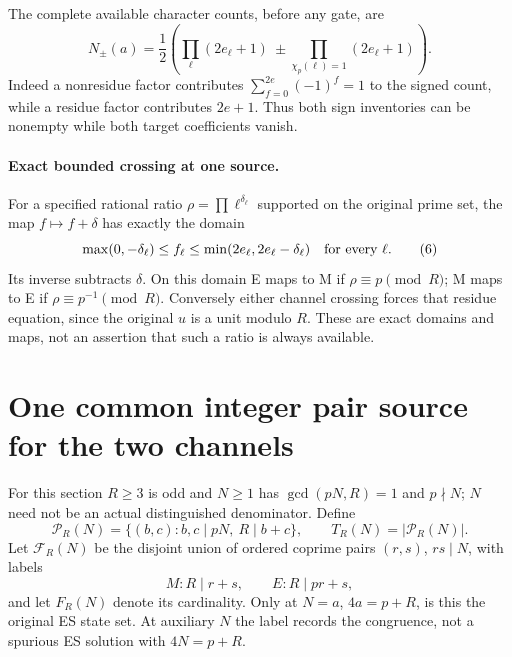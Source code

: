 The complete available character counts, before any gate, are
\[
 N_\pm(a)=\frac12\left(\prod_\ell(2e_\ell+1)
 \ \pm\!\prod_{\chi_p(\ell)=1}(2e_\ell+1)\right).          \tag{5}
\]
Indeed a nonresidue factor contributes $\sum_{f=0}^{2e}(-1)^f=1$ to the signed
count, while a residue factor contributes $2e+1$. Thus both sign inventories can
be nonempty while both target coefficients vanish.

\paragraph{Exact bounded crossing at one source.}
For a specified rational ratio $\rho=\prod\ell^{\delta_\ell}$ supported on the
original prime set, the map $f\mapsto f+\delta$ has exactly the domain
\[
 \max(0,-\delta_\ell)\le f_\ell\le
 \min(2e_\ell,2e_\ell-\delta_\ell)\quad\hbox{for every }\ell. \tag{6}
\]
Its inverse subtracts $\delta$. On this domain E maps to M if
$\rho\equiv p\pmod R$; M maps to E if $\rho\equiv p^{-1}\pmod R$.
Conversely either channel crossing forces that residue equation, since the
original $u$ is a unit modulo $R$. These are exact domains and maps, not an
assertion that such a ratio is always available.



\section{One common integer pair source for the two channels}
For this section $R\ge3$ is odd and $N\ge1$ has $\gcd(pN,R)=1$ and $p\nmid N$;
$N$ need not be an actual distinguished denominator. Define
\[
 \mathcal P_R(N)=\{(b,c):b,c\mid pN,\ R\mid b+c\},\qquad
 T_R(N)=|\mathcal P_R(N)|.                                \tag{7}
\]
Let $\mathcal F_R(N)$ be the disjoint union of ordered coprime pairs $(r,s)$,
$rs\mid N$, with labels
\[
 M:R\mid r+s,\qquad E:R\mid pr+s,
\]
and let $F_R(N)$ denote its cardinality. Only at $N=a$, $4a=p+R$, is this the
original ES state set. At auxiliary $N$ the label records the congruence, not a
spurious ES solution with $4N=p+R$.

